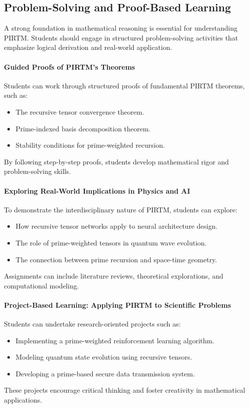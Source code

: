 \documentclass{article}
\theoremstyle{plain}
\begin{document}
\subsection{Problem-Solving and Proof-Based Learning}

A strong foundation in mathematical reasoning is essential for understanding PIRTM. Students should engage in structured problem-solving activities that emphasize logical derivation and real-world application.

\paragraph{Guided Proofs of PIRTM’s Theorems}
Students can work through structured proofs of fundamental PIRTM theorems, such as:
\begin{itemize}
    \item The recursive tensor convergence theorem.
    \item Prime-indexed basis decomposition theorem.
    \item Stability conditions for prime-weighted recursion.
\end{itemize}
By following step-by-step proofs, students develop mathematical rigor and problem-solving skills.

\paragraph{Exploring Real-World Implications in Physics and AI}
To demonstrate the interdisciplinary nature of PIRTM, students can explore:
\begin{itemize}
    \item How recursive tensor networks apply to neural architecture design.
    \item The role of prime-weighted tensors in quantum wave evolution.
    \item The connection between prime recursion and space-time geometry.
\end{itemize}
Assignments can include literature reviews, theoretical explorations, and computational modeling.

\paragraph{Project-Based Learning: Applying PIRTM to Scientific Problems}
Students can undertake research-oriented projects such as:
\begin{itemize}
    \item Implementing a prime-weighted reinforcement learning algorithm.
    \item Modeling quantum state evolution using recursive tensors.
    \item Developing a prime-based secure data transmission system.
\end{itemize}
These projects encourage critical thinking and foster creativity in mathematical applications.
\end{document}
